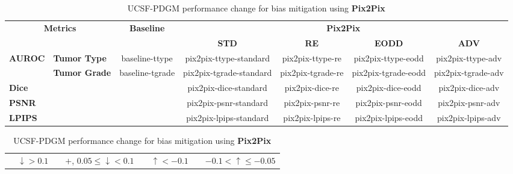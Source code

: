 \begin{table}[]
    \centering
    \caption{UCSF-PDGM performance change for bias mitigation using \textbf{Pix2Pix}}
    \label{tab:ucsf_perf_pix2pix}
    \begin{tabular}{ll|c|cccc}
    \hline
    \multicolumn{2}{c|}{\multirow{2}{*}{\textbf{Metrics}}} 
    & \multirow{2}{*}{\textbf{Baseline}} 
    & \multicolumn{4}{c}{\textbf{Pix2Pix}} \\
    \cline{4-7}
    \multicolumn{2}{c|}{} 
    & 
    & \textbf{STD} & \textbf{RE} & \textbf{EODD} & \textbf{ADV} \\
    \hline

    \multirow{2}{*}{\textbf{AUROC}} 
    & \textbf{Tumor Type} & baseline-ttype & pix2pix-ttype-standard & pix2pix-ttype-re & pix2pix-ttype-eodd & pix2pix-ttype-adv \\
    & \textbf{Tumor Grade} & baseline-tgrade & pix2pix-tgrade-standard & pix2pix-tgrade-re & pix2pix-tgrade-eodd & pix2pix-tgrade-adv \\
    \cline{1-2}

    \multicolumn{2}{l|}{\textbf{Dice}} & \cellcolor[HTML]{C0C0C0} 
    & pix2pix-dice-standard & pix2pix-dice-re & pix2pix-dice-eodd & pix2pix-dice-adv \\
    \cline{1-2}

    \multicolumn{2}{l|}{\textbf{PSNR}} & \cellcolor[HTML]{C0C0C0} 
    & pix2pix-psnr-standard & pix2pix-psnr-re & pix2pix-psnr-eodd & pix2pix-psnr-adv \\
    \cline{1-2}

    \multicolumn{2}{l|}{\textbf{LPIPS}} & \cellcolor[HTML]{C0C0C0} 
    & pix2pix-lpips-standard & pix2pix-lpips-re & pix2pix-lpips-eodd & pix2pix-lpips-adv \\
    \hline
    \end{tabular}

    \begin{tabular}{llllllll} 
        \cellcolor[HTML]{E6C321} & $ \downarrow > 0.1$ & 
        \cellcolor[HTML]{F1D892} &$+$, $0.05 \leq \downarrow < 0.1$ & 
        \cellcolor[HTML]{3089A2} & $\uparrow < -0.1$  & 
        \cellcolor[HTML]{93C1C9} & $-0.1 < \uparrow \leq -0.05$ \\
    \end{tabular}
\end{table}

